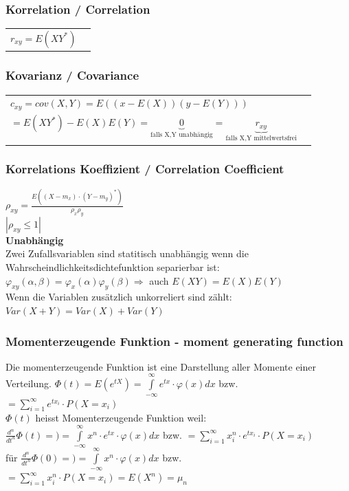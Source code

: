 		\subsubsection{Korrelation / Correlation}
		\begin{tabular}{ll}
        $r_{xy}=E(XY^*)$
        \end{tabular}
		\subsubsection{Kovarianz / Covariance}
		\begin{tabular}{ll}
        $c_{xy}=cov(X,Y)=E((x-E(X))(y-E(Y)))$\\$=E(XY^*)-E(X)E(Y)=\underbrace{0}_{\text{falls X,Y unabhängig}}=
        \underbrace{r_{xy}}_{\text{falls X,Y mittelwertsfrei}}$
        \end{tabular}
        \subsubsection{Korrelations Koeffizient / Correlation Coefficient}
		$\rho_{xy}=\frac{E((X-m_x)\cdot(Y-m_y)^*)}{\rho_x \rho_y}$\\
		$|\rho_{xy}\leq 1|$ \\ 
		\textbf{Unabhängig}\\
		Zwei Zufallsvariablen sind statitisch unabhängig wenn die Wahrscheindlichkeitsdichtefunktion separierbar ist: \\
		$\varphi_{xy}(\alpha, \beta) = \varphi_x(\alpha)\varphi_y(\beta) \Longrightarrow$ auch $E(XY)=E(X)E(Y)$ \\
		Wenn die Variablen zusätzlich unkorreliert sind zählt: $Var(X+Y) = Var(X) + Var(Y)$
		
		
		
	\subsubsection{Momenterzeugende Funktion - moment generating function}
		Die momenterzeugende Funktion ist eine Darstellung aller Momente einer Verteilung. 
		$\Phi(t)=E(e^{tX})=\int\limits_{-\infty}^\infty e^{tx} \cdot \varphi(x) dx$ bzw. $= \sum\limits_{i=1}^{\infty}e^{tx_i} \cdot P(X=x_i)$	\\
		$\Phi(t)$ heisst Momenterzeugende Funktion weil: \\
		$\frac{d^n}{dt^n}\Phi(t)=)=\int\limits_{-\infty}^\infty x^n \cdot e^{tx} \cdot \varphi(x) dx$ bzw. $= \sum\limits_{i=1}^{\infty} x_i^n \cdot e^{tx_i} \cdot P(X=x_i)$\\
		für $\frac{d^n}{dt^n}\Phi(0)=)=\int\limits_{-\infty}^\infty x^n \cdot \varphi(x) dx$ bzw. $= \sum\limits_{i=1}^{\infty} x_i^n \cdot P(X=x_i) = E(X^n)=\mu_n $\\
		
